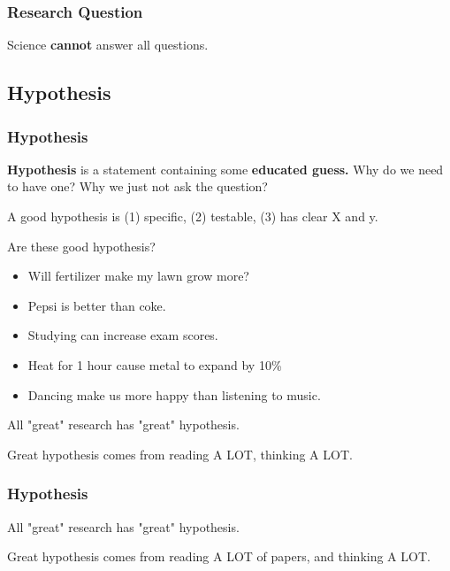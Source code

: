 \documentclass{beamer}
\begin{document}
\begin{frame}
	\frametitle{Research Question}
	\begin{center}
		Science \textbf{cannot} answer all questions.
	\end{center}

\end{frame}

\subsection{Hypothesis}

\begin{frame}
\frametitle{Hypothesis}
\textbf{Hypothesis} is a statement containing some \textbf{educated guess.}  Why do we need to have one?  Why we just not ask the question?

\medskip

A good hypothesis is (1) specific, (2) testable, (3) has clear X and y.

\medskip

Are these good hypothesis?

\begin{itemize}
	\item Will fertilizer make my lawn grow more?
	\item Pepsi is better than coke.
	\item Studying can increase exam scores.
	\item Heat for 1 hour cause metal to expand by 10\%
	\item Dancing make us more happy than listening to music.
\end{itemize} 

All "great" research has "great" hypothesis.

\medskip

Great hypothesis comes from reading A LOT,  thinking A LOT.

\end{frame}

\begin{frame}
\frametitle{Hypothesis}

\begin{center}
All "great" research has "great" hypothesis.

\medskip

Great hypothesis comes from reading A LOT of papers, and thinking A LOT.


\end{center}
\end{frame}
\end{document}
